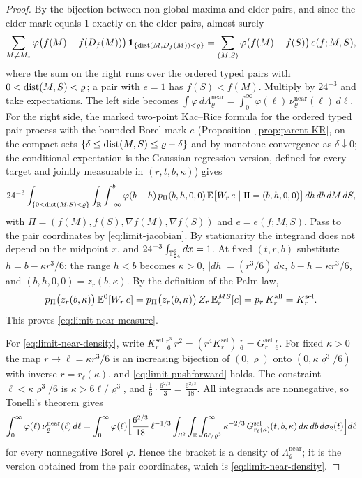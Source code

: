 \begin{proof}
By the bijection between non-global maxima and elder pairs, and since the elder mark equals $1$ exactly on the elder pairs, almost surely
\[
\sum_{M\ne M_*}\varphi\bigl(f(M)-f(D_f(M))\bigr)\,\mathbf 1_{\{\operatorname{dist}(M,D_f(M))<\varrho\}}=\sum_{(M,S)}\varphi\bigl(f(M)-f(S)\bigr)\,e(f;M,S),
\]
where the sum on the right runs over the ordered typed pairs with $0<\operatorname{dist}(M,S)<\varrho$; a pair with $e=1$ has $f(S)<f(M)$. Multiply by $24^{-3}$ and take expectations. The left side becomes $\int\varphi\,d\Lambda^{\mathrm{near}}_\varrho=\int_0^\infty\varphi(\ell)\,\nu^{\mathrm{near}}_\varrho(\ell)\,d\ell$. For the right side, the marked two-point Kac--Rice formula for the ordered typed pair process with the bounded Borel mark $e$ (Proposition~\ref{prop:parent-KR}, on the compact sets $\{\delta\le\operatorname{dist}(M,S)\le\varrho-\delta\}$ and by monotone convergence as $\delta\downarrow0$; the conditional expectation is the Gaussian-regression version, defined for every target and jointly measurable in $(r,t,b,\kappa)$) gives
\begin{equation}\label{eq:limit-near-kr}
24^{-3}\int_{\{0<\operatorname{dist}(M,S)<\varrho\}}\int_{\mathbb R}\int_{-\infty}^{b}\varphi(b-h)\,p_\Pi(b,h,0,0)\,\mathbb E\bigl[W_r\,e\bigm|\Pi=(b,h,0,0)\bigr]\,dh\,db\,dM\,dS,
\end{equation}
with $\Pi=(f(M),f(S),\nabla f(M),\nabla f(S))$ and $e=e(f;M,S)$. Pass to the pair coordinates by \eqref{eq:limit-jacobian}. By stationarity the integrand does not depend on the midpoint $x$, and $24^{-3}\int_{\mathbb T^3_{24}}dx=1$. At fixed $(t,r,b)$ substitute $h=b-\kappa r^3/6$: the range $h<b$ becomes $\kappa>0$, $|dh|=(r^3/6)\,d\kappa$, $b-h=\kappa r^3/6$, and $(b,h,0,0)=z_r(b,\kappa)$. By the definition of the Palm law,
\[
p_\Pi\bigl(z_r(b,\kappa)\bigr)\,\mathbb E^0[W_r\,e]=p_\Pi\bigl(z_r(b,\kappa)\bigr)\,Z_r\,\mathbb E^{MS}_r[e]=p_r\,K^{\mathrm{all}}_r=K^{\mathrm{sel}}_r .
\]
This proves \eqref{eq:limit-near-measure}.

For \eqref{eq:limit-near-density}, write $K^{\mathrm{sel}}_r\,\frac{r^3}{6}\,r^2=(r^4K^{\mathrm{sel}}_r)\,\frac r6=G^{\mathrm{sel}}_r\,\frac r6$. For fixed $\kappa>0$ the map $r\mapsto\ell=\kappa r^3/6$ is an increasing bijection of $(0,\varrho)$ onto $(0,\kappa\varrho^3/6)$ with inverse $r=r_\ell(\kappa)$, and \eqref{eq:limit-pushforward} holds. The constraint $\ell<\kappa\varrho^3/6$ is $\kappa>6\ell/\varrho^3$, and $\frac16\cdot\frac{6^{2/3}}{3}=\frac{6^{2/3}}{18}$. All integrands are nonnegative, so Tonelli's theorem gives
\[
\int_0^\infty\varphi(\ell)\,\nu^{\mathrm{near}}_\varrho(\ell)\,d\ell=\int_0^\infty\varphi(\ell)\Bigl[\frac{6^{2/3}}{18}\,\ell^{-1/3}\int_{S^2}\int_{\mathbb R}\int_{6\ell/\varrho^3}^\infty\kappa^{-2/3}\,G^{\mathrm{sel}}_{r_\ell(\kappa)}(t,b,\kappa)\,d\kappa\,db\,d\sigma_2(t)\Bigr]d\ell
\]
for every nonnegative Borel $\varphi$. Hence the bracket is a density of $\Lambda^{\mathrm{near}}_\varrho$; it is the version obtained from the pair coordinates, which is \eqref{eq:limit-near-density}.
\end{proof}

